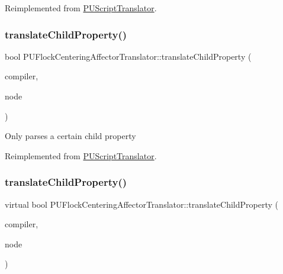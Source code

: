 Reimplemented from \hyperlink{classPUScriptTranslator_ab587d01348ae3e678cb700c719b2b113}{P\+U\+Script\+Translator}.

\mbox{\label{classPUFlockCenteringAffectorTranslator_af091d7fe78ef9cc85ca06ae78ba02de0}} 
\subsubsection{\texorpdfstring{translate\+Child\+Property()}{translateChildProperty()}\hspace{0.1cm}{\footnotesize\ttfamily [1/2]}}
{\footnotesize\ttfamily bool P\+U\+Flock\+Centering\+Affector\+Translator\+::translate\+Child\+Property (\begin{DoxyParamCaption}\item[{\hyperlink{classPUScriptCompiler}{P\+U\+Script\+Compiler} $\ast$}]{compiler,  }\item[{\hyperlink{classPUAbstractNode}{P\+U\+Abstract\+Node} $\ast$}]{node }\end{DoxyParamCaption})\hspace{0.3cm}{\ttfamily [virtual]}}

Only parses a certain child property 

Reimplemented from \hyperlink{classPUScriptTranslator_a0374d83a8a04e57918975d525e0f8fe8}{P\+U\+Script\+Translator}.

\mbox{\label{classPUFlockCenteringAffectorTranslator_ae5f99400bcf8f37ff6253bcd945175fe}} 
\subsubsection{\texorpdfstring{translate\+Child\+Property()}{translateChildProperty()}\hspace{0.1cm}{\footnotesize\ttfamily [2/2]}}
{\footnotesize\ttfamily virtual bool P\+U\+Flock\+Centering\+Affector\+Translator\+::translate\+Child\+Property (\begin{DoxyParamCaption}\item[{\hyperlink{classPUScriptCompiler}{P\+U\+Script\+Compiler} $\ast$}]{compiler,  }\item[{\hyperlink{classPUAbstractNode}{P\+U\+Abstract\+Node} $\ast$}]{node }\end{DoxyParamCaption})\hspace{0.3cm}{\ttfamily [virtual]}}

